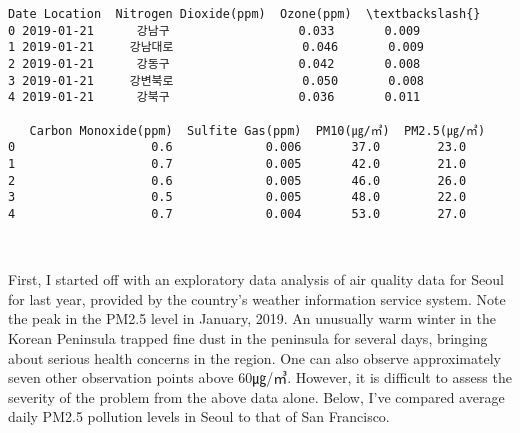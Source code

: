 \documentclass[11pt]{article}
\begin{document}
    \begin{Verbatim}[commandchars=\\\{\}]
        Date Location  Nitrogen Dioxide(ppm)  Ozone(ppm)  \textbackslash{}
0 2019-01-21      강남구                  0.033       0.009   
1 2019-01-21     강남대로                  0.046       0.009   
2 2019-01-21      강동구                  0.042       0.008   
3 2019-01-21     강변북로                  0.050       0.008   
4 2019-01-21      강북구                  0.036       0.011   

   Carbon Monoxide(ppm)  Sulfite Gas(ppm)  PM10(㎍/㎥)  PM2.5(㎍/㎥)  
0                   0.6             0.006       37.0        23.0  
1                   0.7             0.005       42.0        21.0  
2                   0.6             0.005       46.0        26.0  
3                   0.5             0.005       48.0        22.0  
4                   0.7             0.004       53.0        27.0  

    \end{Verbatim}

    \begin{center}
    \end{center}
    { \hspace*{\fill} \\}
    
    First, I started off with an exploratory data analysis of air quality
data for Seoul for last year, provided by the country's weather
information service system. Note the peak in the PM2.5 level in January,
2019. An unusually warm winter in the Korean Peninsula trapped fine dust
in the peninsula for several days, bringing about serious health
concerns in the region. One can also observe approximately seven other
observation points above 60㎍/㎥. However, it is difficult to assess the
severity of the problem from the above data alone. Below, I've compared
average daily PM2.5 pollution levels in Seoul to that of San Francisco.
\end{document}
